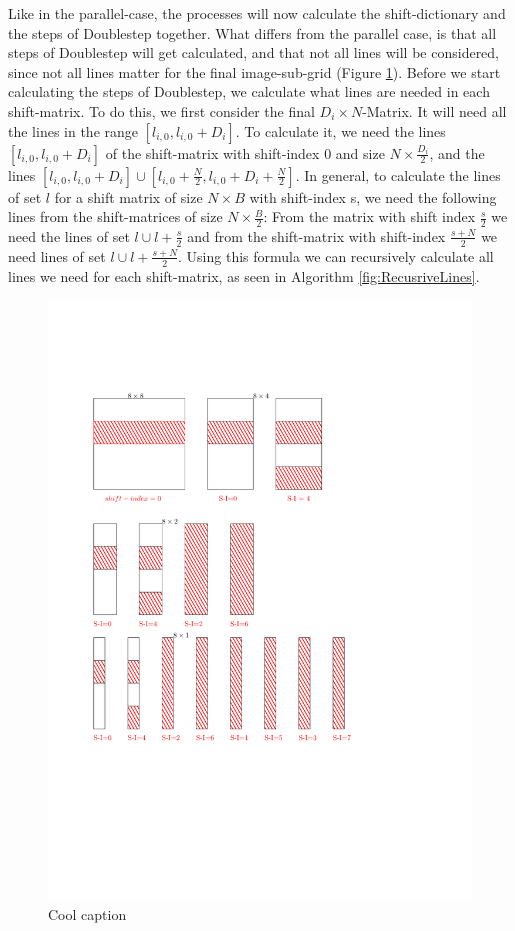 \documentclass[12pt]{article}
\begin{document}
Like in the parallel-case, the processes will now calculate the shift-dictionary and the steps of Doublestep together. What differs from the parallel case, is that all steps of Doublestep will get calculated, and that not all lines will be considered, since not all lines matter for the final image-sub-grid (Figure \ref{fig:doubleStep}). Before we start calculating the steps of Doublestep, we calculate what lines are needed in each shift-matrix. To do this, we first consider the final $D_i \times N$-Matrix. It will need all the lines in the range $[l_{i,0},l_{i,0}+D_i]$. To calculate it, we need the lines $[l_{i,0},l_{i,0}+D_i]$ of the shift-matrix with shift-index 0 and size $N \times \frac{D_i}{2}$, and the lines $[l_{i,0},l_{i,0}+D_i] \cup [l_{i,0}+\frac{N}{2},l_{i,0}+D_i+\frac{N}{2}]$. In general, to calculate the lines of set $l$ for a shift matrix of size $N \times B$ with shift-index s, we need the following lines from the shift-matrices of size $N \times \frac{B}{2}$: From the matrix with shift index $\frac{s}{2}$ we need the lines of set $l \cup l+\frac{s}{2}$ and from the shift-matrix with shift-index $\frac{s+N}{2}$ we need lines of set $l \cup l+\frac{s+N}{2}$. Using this formula we can recursively calculate all lines we need for each shift-matrix, as seen in Algorithm \ref{fig:RecusriveLines}.\\

\begin{figure}[ht]
\includegraphics{doubleStepPerpendicular}
\caption{Cool caption}
\label{fig:doubleStep}
\end{figure}
\end{document}

